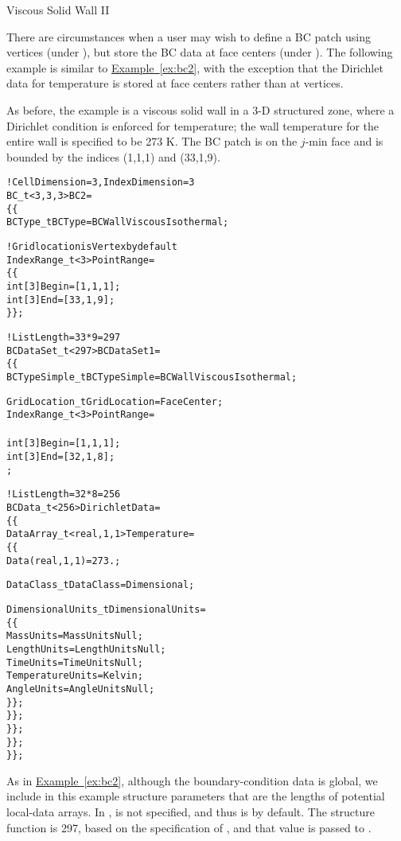 \newpage
\begin{example}{Viscous Solid Wall II}
\label{ex:bc6}

There are circumstances when a user may wish to define a BC patch using
vertices (under ), but store the BC data at face centers
(under ).
The following example is similar to \hyperref[ex:bc2]{Example~\ref*{ex:bc2}},
with the exception that the Dirichlet data for temperature is stored at
face centers rather than at vertices.

As before, the example is a viscous solid wall in a 3-D structured
zone, where a Dirichlet condition is enforced for temperature; the wall
temperature for the entire wall is specified to be 273 K.
The BC patch is on the $j$-min face and is bounded by the indices
(1,1,1) and (33,1,9).
\begin{alltt}
  !  CellDimension = 3, IndexDimension = 3
  BC\_t<3,3,3> BC2 =
    \{\{
    BCType\_t BCType = BCWallViscousIsothermal ;

    !  Grid location is Vertex by default
    IndexRange\_t<3> PointRange =
      \{\{
      int[3] Begin = [1 ,1,1] ;
      int[3] End   = [33,1,9] ;
      \}\} ;

    !  ListLength = 33*9 = 297
    BCDataSet\_t<297> BCDataSet1 =
      \{\{
      BCTypeSimple\_t BCTypeSimple = BCWallViscousIsothermal ;

      GridLocation\_t GridLocation = FaceCenter ;
      IndexRange\_t<3> PointRange =
        {{
        int[3] Begin = [1 ,1,1] ;
        int[3] End   = [32,1,8] ;
        }} ;

      !  ListLength = 32*8 = 256
      BCData\_t<256> DirichletData =
        \{\{
        DataArray\_t<real, 1, 1> Temperature =
          \{\{
          Data(real, 1, 1) = 273. ;
          
          DataClass\_t DataClass = Dimensional ;

          DimensionalUnits\_t DimensionalUnits = 
            \{\{
            MassUnits        = MassUnitsNull ;
            LengthUnits      = LengthUnitsNull ;
            TimeUnits        = TimeUnitsNull ;
            TemperatureUnits = Kelvin ;
            AngleUnits       = AngleUnitsNull ;
            \}\} ;
          \}\} ;
        \}\} ;
      \}\} ;
    \}\} ;
\end{alltt}

As in \hyperref[ex:bc2]{Example~\ref*{ex:bc2}},
although the boundary-condition data is global, we include in this
example structure parameters that are the lengths of potential
local-data arrays.
In ,  is not specified, and thus is
 by default.
The structure function  is 297, based on the
specification of , and that value is passed to
.


\end{example}
